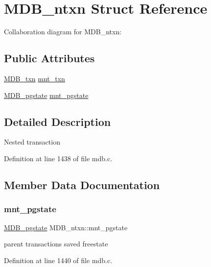 \hypertarget{struct_m_d_b__ntxn}{}\section{M\+D\+B\+\_\+ntxn Struct Reference}
\label{struct_m_d_b__ntxn}


Collaboration diagram for M\+D\+B\+\_\+ntxn\+:
\subsection*{Public Attributes}
\begin{DoxyCompactItemize}
\item 
\mbox{\hyperlink{struct_m_d_b__txn}{M\+D\+B\+\_\+txn}} \mbox{\hyperlink{struct_m_d_b__ntxn_ac27cfb66da175236abbde2ed9ac75b9c}{mnt\+\_\+txn}}
\item 
\mbox{\hyperlink{struct_m_d_b__pgstate}{M\+D\+B\+\_\+pgstate}} \mbox{\hyperlink{struct_m_d_b__ntxn_a1d2719c610db245bf989b72bfd2c8db8}{mnt\+\_\+pgstate}}
\end{DoxyCompactItemize}


\subsection{Detailed Description}
Nested transaction 

Definition at line 1438 of file mdb.\+c.



\subsection{Member Data Documentation}
\mbox{\label{struct_m_d_b__ntxn_a1d2719c610db245bf989b72bfd2c8db8}} 
\subsubsection{\texorpdfstring{mnt\+\_\+pgstate}{mnt\_pgstate}}
{\footnotesize\ttfamily \mbox{\hyperlink{struct_m_d_b__pgstate}{M\+D\+B\+\_\+pgstate}} M\+D\+B\+\_\+ntxn\+::mnt\+\_\+pgstate}

parent transaction\textquotesingle{}s saved freestate 

Definition at line 1440 of file mdb.\+c.

